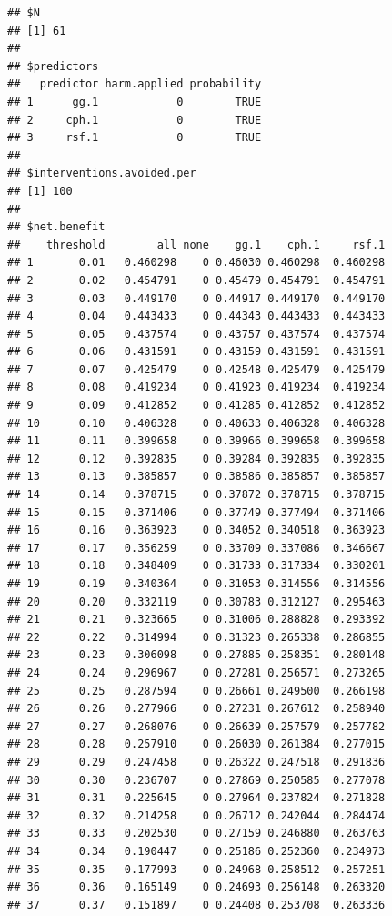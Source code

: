 \documentclass{article}\usepackage[]{graphicx}\usepackage[]{color}
\makeatletter
\newenvironment{kframe}{%
 \def\at@end@of@kframe{}%
 \ifinner\ifhmode%
  \def\at@end@of@kframe{\end{minipage}}%
  \begin{minipage}{\columnwidth}%
 \fi\fi%
 \def\FrameCommand##1{\hskip\@totalleftmargin \hskip-\fboxsep
 \colorbox{shadecolor}{##1}\hskip-\fboxsep
     \hskip-\linewidth \hskip-\@totalleftmargin \hskip\columnwidth}%
 \MakeFramed {\advance\hsize-\width
   \@totalleftmargin\z@ \linewidth\hsize
   \@setminipage}}%
 {\par\unskip\endMakeFramed%
 \at@end@of@kframe}
\newenvironment{knitrout}{}{} %
\makeatother
\begin{document}
\begin{knitrout}
\begin{kframe}\begin{verbatim}
## $N
## [1] 61
## 
## $predictors
##   predictor harm.applied probability
## 1      gg.1            0        TRUE
## 2     cph.1            0        TRUE
## 3     rsf.1            0        TRUE
## 
## $interventions.avoided.per
## [1] 100
## 
## $net.benefit
##    threshold        all none    gg.1    cph.1     rsf.1
## 1       0.01   0.460298    0 0.46030 0.460298  0.460298
## 2       0.02   0.454791    0 0.45479 0.454791  0.454791
## 3       0.03   0.449170    0 0.44917 0.449170  0.449170
## 4       0.04   0.443433    0 0.44343 0.443433  0.443433
## 5       0.05   0.437574    0 0.43757 0.437574  0.437574
## 6       0.06   0.431591    0 0.43159 0.431591  0.431591
## 7       0.07   0.425479    0 0.42548 0.425479  0.425479
## 8       0.08   0.419234    0 0.41923 0.419234  0.419234
## 9       0.09   0.412852    0 0.41285 0.412852  0.412852
## 10      0.10   0.406328    0 0.40633 0.406328  0.406328
## 11      0.11   0.399658    0 0.39966 0.399658  0.399658
## 12      0.12   0.392835    0 0.39284 0.392835  0.392835
## 13      0.13   0.385857    0 0.38586 0.385857  0.385857
## 14      0.14   0.378715    0 0.37872 0.378715  0.378715
## 15      0.15   0.371406    0 0.37749 0.377494  0.371406
## 16      0.16   0.363923    0 0.34052 0.340518  0.363923
## 17      0.17   0.356259    0 0.33709 0.337086  0.346667
## 18      0.18   0.348409    0 0.31733 0.317334  0.330201
## 19      0.19   0.340364    0 0.31053 0.314556  0.314556
## 20      0.20   0.332119    0 0.30783 0.312127  0.295463
## 21      0.21   0.323665    0 0.31006 0.288828  0.293392
## 22      0.22   0.314994    0 0.31323 0.265338  0.286855
## 23      0.23   0.306098    0 0.27885 0.258351  0.280148
## 24      0.24   0.296967    0 0.27281 0.256571  0.273265
## 25      0.25   0.287594    0 0.26661 0.249500  0.266198
## 26      0.26   0.277966    0 0.27231 0.267612  0.258940
## 27      0.27   0.268076    0 0.26639 0.257579  0.257782
## 28      0.28   0.257910    0 0.26030 0.261384  0.277015
## 29      0.29   0.247458    0 0.26322 0.247518  0.291836
## 30      0.30   0.236707    0 0.27869 0.250585  0.277078
## 31      0.31   0.225645    0 0.27964 0.237824  0.271828
## 32      0.32   0.214258    0 0.26712 0.242044  0.284474
## 33      0.33   0.202530    0 0.27159 0.246880  0.263763
## 34      0.34   0.190447    0 0.25186 0.252360  0.234973
## 35      0.35   0.177993    0 0.24968 0.258512  0.257251
## 36      0.36   0.165149    0 0.24693 0.256148  0.263320
## 37      0.37   0.151897    0 0.24408 0.253708  0.263336

\end{verbatim}
\end{kframe}
\end{knitrout}
\end{document}
